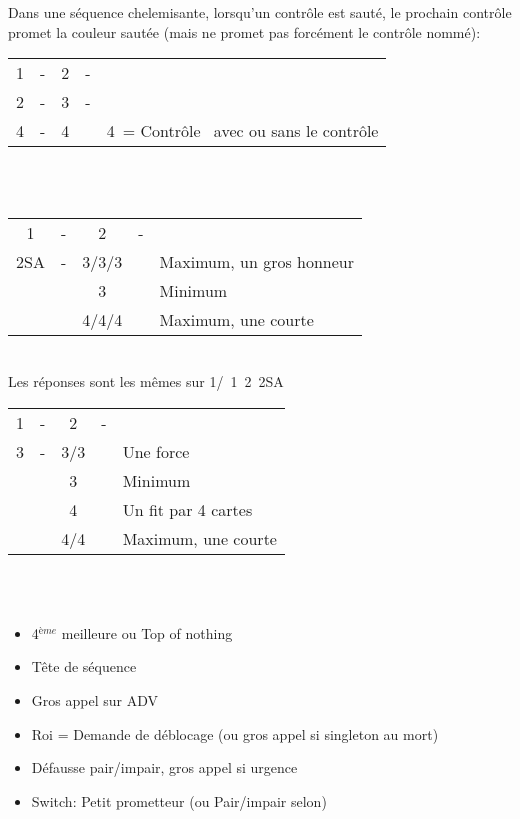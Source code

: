 \documentclass[a4paper, oneside, 11pt]{report}
\begin{document}
	Dans une séquence chelemisante,  lorsqu'un contrôle est sauté,  le prochain contrôle promet la couleur sautée (mais ne promet pas forcément le contrôle nommé):\\
	\begin{tabular}{cccc|l}
	1\pique & -  & 2\trefle & - &\\
	2\pique & - & 3\pique & - &\\
	4\carreau & - & 4\coeur && 4\coeur\ = Contrôle \trefle\ avec ou sans le contrôle \coeur\\
	\end{tabular}\\\\

	\begin{tabular}{cccc|l}
	1\pique & -  & 2\pique & - &\\
	2SA & - & 3\trefle/3\carreau/3\coeur && Maximum,  un gros honneur\\
	&& 3\pique && Minimum\\
	&& 4\trefle/4\carreau/4\coeur && Maximum,  une courte\\
	\end{tabular}\\
	Les réponses sont les mêmes sur 1\trefle/\carreau\ 1\pique\ 2\pique\ 2SA\\

	\begin{tabular}{cccc|l}
	1\pique & -  & 2\pique & - &\\
	3\trefle & - & 3\carreau/3\coeur && Une force\\
	&& 3\pique && Minimum\\
	&& 4\trefle && Un fit par 4 cartes\\
	&& 4\carreau/4\coeur && Maximum,  une courte\\
	\end{tabular}\\\\

		\begin{itemize}
		\item 4$^{ème}$ meilleure ou Top of nothing
		\item Tête de séquence
		\item Gros appel sur ADV
		\item Roi = Demande de déblocage (ou gros appel si singleton au mort)
		\item Défausse pair/impair,  gros appel si urgence
		\item Switch: Petit prometteur (ou Pair/impair selon)\\
		\end{itemize}
\end{document}
